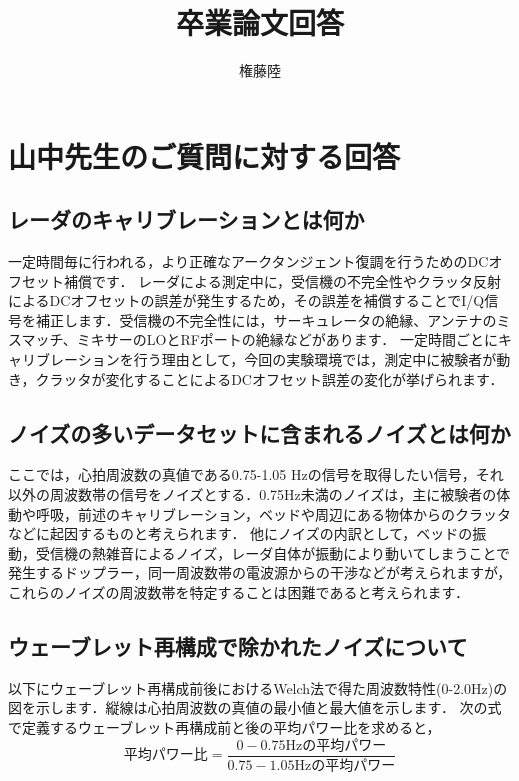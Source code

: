 \documentclass[dvipdfmx]{jsarticle}
\begin{document}
\title{卒業論文回答}
\author{権藤陸}
\maketitle
\section{山中先生のご質問に対する回答}
\subsection{レーダのキャリブレーションとは何か}
一定時間毎に行われる，より正確なアークタンジェント復調を行うためのDCオフセット補償です．
レーダによる測定中に，受信機の不完全性やクラッタ反射によるDCオフセットの誤差が発生するため，その誤差を補償することでI/Q信号を補正します．受信機の不完全性には，サーキュレータの絶縁、アンテナのミスマッチ、ミキサーのLOとRFポートの絶縁などがあります\cite{calibration}．
一定時間ごとにキャリブレーションを行う理由として，今回の実験環境では，測定中に被験者が動き，クラッタが変化することによるDCオフセット誤差の変化が挙げられます．

\subsection{ノイズの多いデータセットに含まれるノイズとは何か}
ここでは，心拍周波数の真値である0.75-1.05 Hzの信号を取得したい信号，それ以外の周波数帯の信号をノイズとする．0.75Hz未満のノイズは，主に被験者の体動や呼吸，前述のキャリブレーション，ベッドや周辺にある物体からのクラッタなどに起因するものと考えられます．
他にノイズの内訳として，ベッドの振動，受信機の熱雑音によるノイズ，レーダ自体が振動により動いてしまうことで発生するドップラー，同一周波数帯の電波源からの干渉などが考えられますが，これらのノイズの周波数帯を特定することは困難であると考えられます．

\subsection{ウェーブレット再構成で除かれたノイズについて}
以下にウェーブレット再構成前後におけるWelch法で得た周波数特性(0-2.0Hz)の図を示します．縦線は心拍周波数の真値の最小値と最大値を示します．
次の式で定義するウェーブレット再構成前と後の平均パワー比を求めると，
\begin{equation}\label{}
平均パワー比 = \frac{0-0.75 \mathrm{Hz}の平均パワー}{0.75-1.05 \mathrm{Hz}の平均パワー}
\end{equation}
\end{document}
